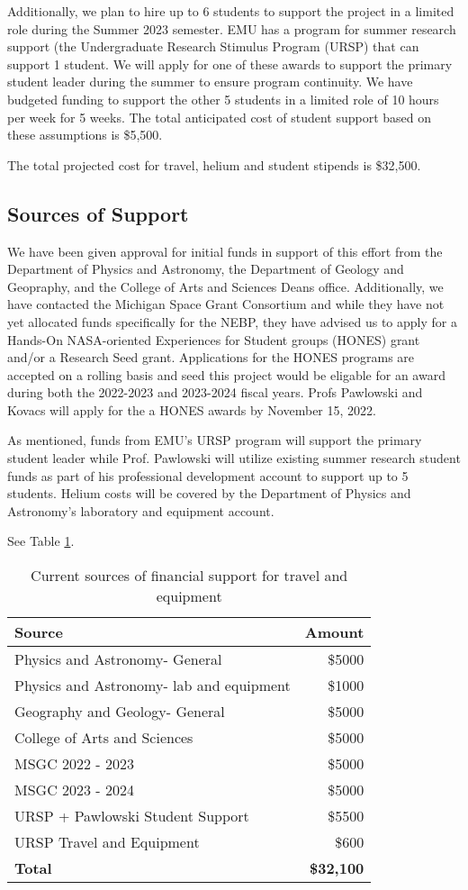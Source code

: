 \documentclass[12pt]{article}
\begin{document}
Additionally, we plan to hire up to 6 students to support the project in a limited role
during the Summer 2023 semester. EMU has a program for summer research
support (the Undergraduate Research Stimulus Program (URSP) that
can support 1 student.
We will apply for one of these awards to support the primary
student leader during the summer to ensure program continuity. We have budgeted
funding to support the other 5 students in a limited role of 10 hours per week
for 5 weeks. The total anticipated cost of student support based on these assumptions is \$5,500.

The total projected cost for travel, helium and student stipends is \$32,500.

\subsection{Sources of Support}

We have been given approval for initial funds in support of this effort
from the Department of Physics and Astronomy, the Department of
Geology and Geopraphy, and the College of Arts and Sciences Deans office.
Additionally, we have contacted the Michigan Space Grant Consortium
and while they have not yet allocated funds specifically for the NEBP, they
have advised us to apply for a Hands-On NASA-oriented Experiences for Student groups
(HONES) grant and/or a Research Seed grant.
Applications for the HONES programs are accepted on a rolling basis and seed
this project would be eligable for an award during both the 2022-2023 and
2023-2024 fiscal years. Profs Pawlowski and Kovacs will apply for
the a HONES awards by November 15, 2022.

As mentioned, funds from EMU's URSP program will support the primary student leader while
Prof. Pawlowski will utilize existing summer research
student funds as part of his professional development account to support up to 5 students.
Helium costs will be covered by the Department of Physics and Astronomy's laboratory
and equipment account.


 See Table \ref{money}.


\begin{table}[h]
\centering
\begin{tabular}{|l|r|}
\hline
Source&Amount\\
\hline
Physics and Astronomy- General&\$5000\\
Physics and Astronomy- lab and equipment&\$1000\\
Geography and Geology- General&\$5000\\
College of Arts and Sciences&\$5000\\
MSGC 2022 - 2023&\$5000\\
MSGC 2023 - 2024&\$5000\\
URSP + Pawlowski Student Support& \$5500\\
URSP Travel and Equipment&\$600\\

\hline
{\bf Total}&{\bf \$32,100}\\
\hline
\end{tabular}
\caption{Current sources of financial support for travel and equipment}
\label{money}
\end{table}
\end{document}
